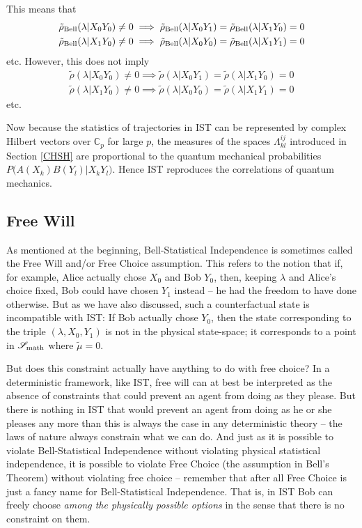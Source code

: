 \documentclass{article}
\begin{document}
This means that 
\begin{eqnarray}
\tilde \rho_{\rm Bell} (\lambda | X_0 Y_0) \ne 0 \implies \tilde \rho_{\rm Bell}(\lambda | X_0 Y_1) = \tilde \rho_{\rm Bell}(\lambda | X_1 Y_0)=0 \\
\tilde \rho_{\rm Bell} (\lambda | X_1 Y_0) \ne 0 \implies \tilde \rho_{\rm Bell}(\lambda | X_0 Y_0) = \tilde \rho_{\rm Bell}(\lambda | X_1 Y_1)=0
\end{eqnarray}
etc. However, this does not imply
\begin{eqnarray}
\tilde \rho(\lambda | X_0 Y_0) \ne 0 \implies \tilde \rho(\lambda | X_0 Y_1) = \tilde \rho(\lambda | X_1 Y_0)=0\\
\tilde \rho(\lambda | X_1 Y_0) \ne 0 \implies \tilde \rho(\lambda | X_0 Y_0) = \tilde \rho(\lambda | X_1 Y_1)=0
\end{eqnarray}
etc.

Now because the statistics of trajectories in {\sc IST} can be represented by complex Hilbert vectors over $\mathbb C_p$ for large $p$, the measures of the spaces $\Lambda^{ij}_{kl}$ introduced in Section \ref{CHSH} are proportional to the quantum mechanical probabilities $P\big(A(X_k)B(Y_l)|X_k Y_l\big)$. Hence {\sc IST} reproduces the correlations of quantum mechanics.

\subsection{Free Will}\label{free}
As mentioned at the beginning, Bell-Statistical Independence is sometimes called the Free Will and/or Free Choice assumption. This refers to the notion that if, for example, Alice actually chose $X_0$ and Bob $Y_0$, then, keeping $\lambda$ and Alice’s choice fixed, Bob could have chosen $Y_1$ instead -- he had the freedom to have done otherwise. But as we have also discussed, such a counterfactual state is incompatible with {\sc IST}: If Bob actually chose $Y_0$, then the state corresponding to the triple $(\lambda, X_0, Y_1)$ is not in the physical state-space; it corresponds to a point in ${\mathscr S}_{\rm math}$ where $\tilde \mu=0$. 

But does this constraint actually have anything to do with free choice? In a deterministic framework, like {\sc IST}, free will can at best be interpreted as the absence of constraints that could prevent an agent from doing as they please. But there is nothing in {\sc IST} that would prevent an agent from doing as he or she pleases any more than this is always the case in any deterministic theory -- the laws of nature always constrain what we can do. And just as it is possible to violate Bell-Statistical Independence without violating physical statistical independence, it is possible to violate Free Choice (the assumption in Bell's Theorem) without violating free choice -- remember that after all Free Choice is just a fancy name for Bell-Statistical Independence. That is, in {\sc IST} Bob can freely choose \emph{among the physically possible options} in the sense that there is no constraint on them. 
\end{document}
